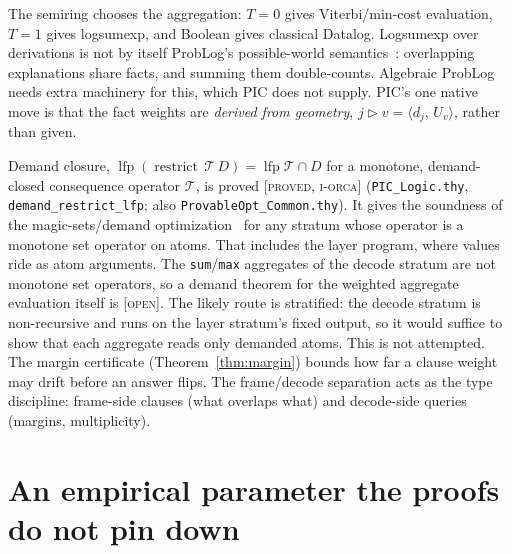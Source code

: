 \documentclass[11pt]{article}
\theoremstyle{definition}
\theoremstyle{plain}
\theoremstyle{remark}
\newcommand{\proved}{\textsc{[proved, i-orca]}}
\newcommand{\open}{\textsc{[open]}}
\newcommand{\inner}[2]{\langle #1,\, #2\rangle}
\begin{document}
The semiring chooses the aggregation: $T=0$ gives Viterbi/min-cost evaluation, $T=1$ gives logsumexp,
and Boolean gives classical Datalog. Logsumexp over derivations is not by itself ProbLog's possible-world
semantics~\cite{deraedt2007problog}: overlapping explanations share facts, and summing them double-counts.
Algebraic ProbLog~\cite{kimmig2011algebraic} needs extra machinery for this, which PIC does not supply. PIC's one native move is that the fact weights are
\emph{derived from geometry}, $j\triangleright v=\inner{d_j}{U_v}$, rather than given.

Demand closure, $\operatorname{lfp}(\operatorname{restrict}\,\mathcal T\,D)=\operatorname{lfp}\mathcal T\cap D$ for a
monotone, demand-closed consequence operator $\mathcal T$, is proved \proved{} (\texttt{PIC\_Logic.thy},
\texttt{demand\_restrict\_lfp}; also \texttt{ProvableOpt\_Common.thy}). It gives the soundness of the
magic-sets/demand optimization~\cite{bancilhon1986magic} for any stratum whose operator is a monotone set operator on atoms. That
includes the layer program, where values ride as atom arguments. The \texttt{sum}/\texttt{max} aggregates of
the decode stratum are not monotone set operators, so a demand theorem for the weighted aggregate
evaluation itself is \open{}. The likely route is stratified: the decode stratum is non-recursive
and runs on the layer stratum's fixed output, so it would suffice to show that each aggregate reads only
demanded atoms. This is not attempted. The margin certificate (Theorem~\ref{thm:margin}) bounds how far a clause
weight may drift before an answer flips. The frame/decode separation acts as the type discipline:
frame-side clauses (what overlaps what) and decode-side queries (margins, multiplicity).

\section{An empirical parameter the proofs do not pin down}\label{sec:tau}
\end{document}
